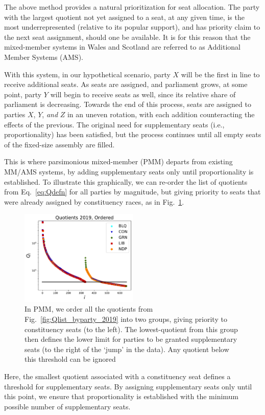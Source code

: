 The above method provides a natural prioritization for seat allocation.
The party with the largest quotient not yet assigned to a seat, at any given time, is the most underrepresented (relative to its popular support), and has priority claim to the next seat assignment, should one be available.
It is for this reason that the mixed-member systems in Wales and Scotland are referred to as Additional Member Systems (AMS).

With this system, in our hypothetical scenario, party $X$ will be the first in line to receive additional seats. As seats are assigned, and parliament grows, at some point, party $Y$ will begin to receive seats as well, since its relative share of parliament is decreasing.
Towards the end of this process, seats are assigned to parties $X$, $Y$, \emph{and} $Z$ in an uneven rotation, with each addition counteracting the effects of the previous. The original need for supplementary seats (i.e., proportionality) has been satisfied, but the process continues until all empty seats of the fixed-size assembly are filled.

This is where parsimonious mixed-member (PMM) departs from existing MM/AMS systems, by adding supplementary seats only until proportionality is established. To illustrate this graphically, we can re-order the list of quotients from Eq.~\ref{eq:Qdefn} for all parties by magnitude, but giving priority to seats that were already assigned by constituency races, as in Fig.~\ref{fig:Qlist_all_2019}.
\begin{figure}
  \includegraphics[width=0.50\textwidth,clip]{PR_calcs/data/raw_2019/PMM_out/PMM_Qlist_all}
  \captionsetup{format=default}
  \caption{ In PMM, we order all the quotients from Fig.~\ref{fig:Qlist_byparty_2019} into two groups, giving priority to constituency seats (to the left). The lowest-quotient from this group then defines the lower limit for parties to be granted supplementary seats (to the right of the `jump' in the data). Any quotient below this threshold can be ignored }
\label{fig:Qlist_all_2019}
\end{figure}
Here, the smallest quotient associated with a constituency seat defines a threshold for supplementary seats. By assigning supplementary seats only until this point, we ensure that proportionality is established with the minimum possible number of supplementary seats.

